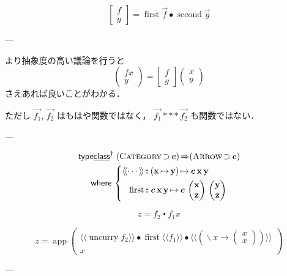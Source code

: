 \documentclass[a5paper,twoside,fleqn,draft]{jsbook}
\newcommand{\Langle}{\langle\!\langle}
\newcommand{\Rangle}{\rangle\!\rangle}
\newcommand{\mKeyword}[1]{\mathsf{#1}}
\newcommand{\mKeywordUnderline}[1]{\text{\underline{\textsf{#1}}}}
\newcommand{\mTypeClassDeclKeyword}{\mKeyword{type}\mKeywordUnderline{class}}
\newcommand{\mWhereKeyword}{\mKeyword{where}}
\DeclareMathOperator{\mSuperClass}{\Rightarrow}
\DeclareMathOperator{\mSuperSet}{\supset}
\DeclareMathOperator{\mTypeClassDeclPolymorphic}{\mTypeClassDeclKeyword^\dagger}
\DeclareMathOperator{\mWhere}{\mWhereKeyword}
\newcommand{\mSpecialFunc}[1]{#1}
\DeclareMathOperator{\mFirst}{\mSpecialFunc{first}}
\DeclareMathOperator{\mSecond}{\mSpecialFunc{second}}
\DeclareMathOperator{\mUncurry}{\mSpecialFunc{uncurry}}
\DeclareMathOperator{\mComp}{\centerdot}
\DeclareMathOperator{\mCompCat}{\bullet}
\DeclareMathOperator{\mIn}{{:\!:}}
\DeclareMathOperator{\mLambda}{\backslash}
\DeclareMathOperator{\mLambdaArrow}{\rightarrow}
\DeclareMathOperator{\mMapsTo}{\mapsto}
\newcommand{\mType}[1]{\mathbf{#1}} %
\newcommand{\mPolymorphicTypeParameter}[1]{\textbf{\textit{#1}}}
\newcommand{\mX}{\mType{x}}
\newcommand{\mY}{\mType{y}}
\newcommand{\mZ}{\mType{z}}
\newcommand{\mTypeConstructor}[1]{\textsl{#1}}
\newcommand{\mValueConstructor}[1]{\mathrm{#1}}
\newcommand{\mValueWith}[2]{\mValueConstructor{#1}\,#2}
\newcommand{\mArrowWith}[1]{\Langle#1\Rangle}
\newcommand{\mPairWith}[2]{\begin{pmatrix}#1\\#2\end{pmatrix}}
\newcommand{\mTypeClass}[1]{\textsc{#1}} %
\newcommand{\mArrowTypeClass}{\mTypeClass{Arrow}}
\newcommand{\mCategoryTypeClass}{\mTypeClass{Category}}
\begin{document}
\begin{equation}
  \begin{bmatrix}
    f\\g
  \end{bmatrix}
  =\mFirst\Vec{f}\mCompCat\mSecond\Vec{g}
\end{equation}

---

より抽象度の高い議論を行うと
\begin{equation}
  \mPairWith{fx}{y}
  =\begin{bmatrix}f\\g\end{bmatrix}
  \mPairWith{x}{y}
\end{equation}
さえあれば良いことがわかる．


ただし $\Vec{f_1}$, $\Vec{f_2}$ はもはや関数ではなく，
$\Vec{f_1}***\Vec{f_2}$ も関数ではない．

---

\newcommand{\mFirstFunc}{\mathop{\mathrm{first}}}

\begin{multline}
  \mTypeClassDeclPolymorphic\;
  (\mCategoryTypeClass\mSuperSet\mPolymorphicTypeParameter{c})
  \mSuperClass(\mArrowTypeClass\mSuperSet\mPolymorphicTypeParameter{c})\\
  \mWhere{}\left\{
  \begin{aligned}
    \mArrowWith{\dotsb}
    &\mIn{}(\mX\mMapsTo\mY)\mMapsTo\mPolymorphicTypeParameter{c}\,\mX\,\mY\\
    \mFirstFunc
    &\mIn{}\mPolymorphicTypeParameter{c}\,\mX\,\mY
    \mMapsTo\mPolymorphicTypeParameter{c}\,\mPairWith{\mX}{\mZ}\,\mPairWith{\mY}{\mZ}
  \end{aligned}
  \right.
\end{multline}

\begin{equation}
  z=f_2\mComp f_1x
\end{equation}

\begin{equation}
  z=\mathop{\mathrm{app}}\mPairWith{\mArrowWith{\mUncurry f_2}\mCompCat\mFirstFunc\mArrowWith{f_1}\mCompCat{}\mArrowWith{\left(\mLambda x\mLambdaArrow\mPairWith{x}{x}\right)}}{x}
\end{equation}

---


\newcommand{\mUncircuit}{\mathop{\mathrm{uncircuit}}}
\newcommand{\mCircuitType}{\mTypeConstructor{Circ}}
\newcommand{\mCircuitWith}[1]{\mValueWith{Circ}{#1}}
\end{document}
